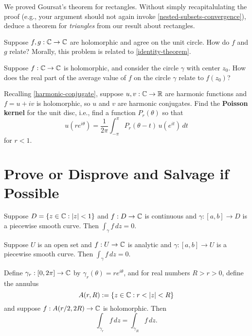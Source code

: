 \documentclass{homework}
\begin{document}
\begin{problem}
  We proved Goursat's theorem for rectangles.  Without simply
  recapitalulating the proof (e.g., your argument should not again
  invoke \ref{nested-subsets-convergence}), deduce a theorem for
  \textit{triangles} from our result about rectangles.
\end{problem}

\begin{problem}
  Suppose $f, g : \mathbb{C} \to \mathbb{C}$ are holomorphic and agree on the unit
  circle.  How do $f$ and $g$ relate?  Morally, this problem is
  related to \ref{identity-theorem}.
\end{problem}

 \begin{problem}
   Suppose $f : \mathbb{C} \to \mathbb{C}$ is holomorphic, and consider the circle
   $\gamma$ with center $z_0$.  How does the real part of the average
   value of $f$ on the circle $\gamma$ relate to $f(z_0)$?
 \end{problem}

 \begin{problem}
   Recalling \ref{harmonic-conjugate}, suppose $u, v : \mathbb{C} \to \mathbb{R}$ are
   harmonic functions and $f = u + iv$ is holomorphic, so $u$ and $v$
   are harmonic conjugates.  Find the \textbf{Poisson kernel} for the
   unit disc, i.e., find a function $P_r(\theta)$ so that
   \[
     u(re^{i\theta}) = \frac {1}{2\pi} \int_{-\pi }^{\pi } P_{r}(\theta -t) \, u(e^{it}) \, dt
   \]
   for $r < 1$.
 \end{problem}

\section{Prove or Disprove and Salvage if Possible}

\begin{problem}
  Suppose $D = \{ z \in \mathbb{C} : \left|z\right| < 1 \}$ and $f : D \to \mathbb{C}$ is
  continuous and $\gamma : [a,b] \to D$ is a piecewise smooth curve.
  Then $\displaystyle\int_\gamma f\, dz = 0$.
\end{problem}
  
\begin{problem}
  Suppose $U$ is an open set and $f : U \to \mathbb{C}$ is analytic and
  $\gamma : [a,b] \to U$ is a piecewise smooth curve.  Then
  $\displaystyle\int_\gamma f \, dz = 0$.
\end{problem}

\begin{problem}
  Define $\gamma_r : [0,2\pi] \to \mathbb{C}$ by
  $\gamma_r(\theta) = r e^{i \theta}$, and for real numbers
  $R > r > 0$, define the annulus
  \[
    A(r,R) := \{ z \in \mathbb{C} : r < |z| < R \}
  \]
  and suppose $f : A(r/2,2R) \to \mathbb{C}$ is holomorphic.  Then
  \[
    \int_{\gamma_r} f \, dz = \int_{\gamma_R} f \, dz.
  \]
\end{problem}
\end{document}

